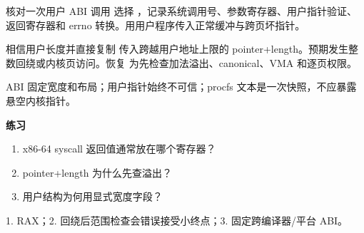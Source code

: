 
\begin{experimentbox}{核对一次用户 ABI 调用}
选择 ，记录系统调用号、参数寄存器、用户指针验证、返回寄存器和
errno 转换。用用户程序传入正常缓冲与跨页坏指针。
\end{experimentbox}

\begin{faultinjectionbox}{相信用户长度并直接复制}
传入跨越用户地址上限的 pointer+length。预期发生整数回绕或内核页访问。恢复
为先检查加法溢出、canonical、VMA 和逐页权限。
\end{faultinjectionbox}

\begin{pitfallbox}
ABI 固定宽度和布局；用户指针始终不可信；procfs 文本是一次快照，不应暴露
悬空内核指针。
\end{pitfallbox}

\textbf{练习}
\begin{enumerate}[leftmargin=2.2em]
  \item x86-64 syscall 返回值通常放在哪个寄存器？
  \item pointer+length 为什么先查溢出？
  \item 用户结构为何用显式宽度字段？
\end{enumerate}
\begin{answerbox}
1. RAX；2. 回绕后范围检查会错误接受小终点；3. 固定跨编译器/平台 ABI。
\end{answerbox}
